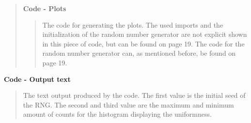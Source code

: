 \begin{quote}
\textbf{Code - Plots}



\begin{quote}
The code for generating the plots. The used imports and the initialization of the random number generator are not explicit shown in this piece of code, but can be found on page 19. The code for the random number generator can, as mentioned before, be found on page 19.


\end{quote}
\end{quote}

\textbf{Code - Output text } 
\begin{quote}
The text output produced by the code. The first value is the initial seed of the RNG. The second and third value are the maximum and minimum amount of counts for the histogram displaying the uniformness.

\end{quote}
\newpage

